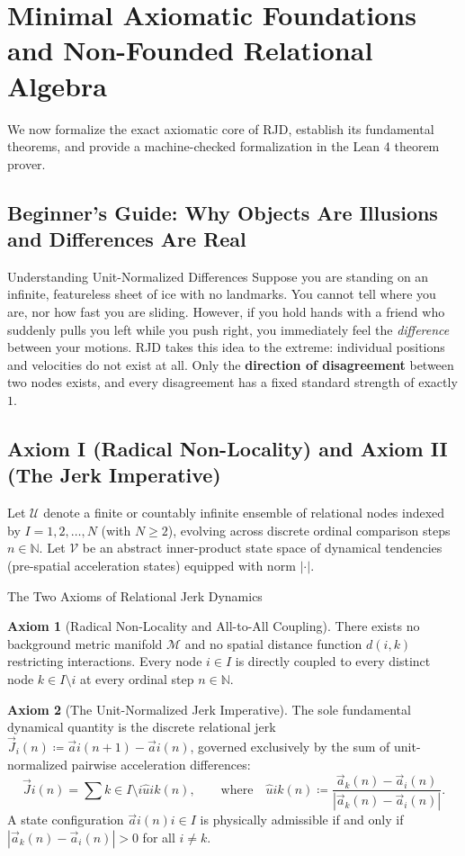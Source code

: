 \documentclass[11pt,a4paper]{article}
\theoremstyle{plain}
\theoremstyle{definition}
\newtheorem{axiom}{Axiom}[section]
\theoremstyle{remark}
\begin{document}
\section{Minimal Axiomatic Foundations and Non-Founded Relational Algebra}
\label{sec:axiomatics}
We now formalize the exact axiomatic core of RJD, establish its fundamental theorems, and provide a machine-checked formalization in the Lean 4 theorem prover.
\subsection{Beginner's Guide: Why Objects Are Illusions and Differences Are Real}
\begin{noobbox}{Understanding Unit-Normalized Differences}
Suppose you are standing on an infinite, featureless sheet of ice with no landmarks. You cannot tell where you are, nor how fast you are sliding. However, if you hold hands with a friend who suddenly pulls you left while you push right, you immediately feel the \textit{difference} between your motions. RJD takes this idea to the extreme: individual positions and velocities do not exist at all. Only the \textbf{direction of disagreement} between two nodes exists, and every disagreement has a fixed standard strength of exactly $1$.
\end{noobbox}
\subsection{Axiom I (Radical Non-Locality) and Axiom II (The Jerk Imperative)}
Let $\mathcal{U}$ denote a finite or countably infinite ensemble of relational nodes indexed by $I = {1, 2, \dots, N}$ (with $N \ge 2$), evolving across discrete ordinal comparison steps $n \in \mathbb{N}$. Let $\mathcal{V}$ be an abstract inner-product state space of dynamical tendencies (pre-spatial acceleration states) equipped with norm $|\cdot|$.
\begin{axiombox}{The Two Axioms of Relational Jerk Dynamics}
\begin{axiom}[Radical Non-Locality and All-to-All Coupling]
There exists no background metric manifold $\mathcal{M}$ and no spatial distance function $d(i,k)$ restricting interactions. Every node $i \in I$ is directly coupled to every distinct node $k \in I \setminus {i}$ at every ordinal step $n \in \mathbb{N}$.
\end{axiom}
\begin{axiom}[The Unit-Normalized Jerk Imperative]
The sole fundamental dynamical quantity is the discrete relational jerk $\vec{J}_i(n) \coloneqq \vec{a}i(n+1) - \vec{a}i(n)$, governed exclusively by the sum of unit-normalized pairwise acceleration differences:
\begin{equation}
\vec{J}i(n) = \sum{k \in I \setminus {i}} \hat{u}{ik}(n), \qquad \text{where} \quad \hat{u}{ik}(n) \coloneqq \frac{\vec{a}_k(n) - \vec{a}_i(n)}{|\vec{a}_k(n) - \vec{a}_i(n)|}.
\label{eq:axiom_jerk}
\end{equation}
A state configuration ${\vec{a}i(n)}{i \in I}$ is physically admissible if and only if $|\vec{a}_k(n) - \vec{a}_i(n)| > 0$ for all $i \neq k$.
\end{axiom}
\end{axiombox}
\end{document}
